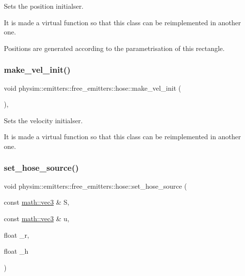 Sets the position initialser. 

It is made a virtual function so that this class can be reimplemented in another one.

Positions are generated according to the parametrisation of this rectangle. \mbox{\label{classphysim_1_1emitters_1_1free__emitters_1_1hose_a7976365f9101e4095d00dc8eafc82ebb}} 
\subsubsection{\texorpdfstring{make\+\_\+vel\+\_\+init()}{make\_vel\_init()}}
{\footnotesize\ttfamily void physim\+::emitters\+::free\+\_\+emitters\+::hose\+::make\+\_\+vel\+\_\+init (\begin{DoxyParamCaption}{ }\end{DoxyParamCaption})\hspace{0.3cm}{\ttfamily [protected]}, {\ttfamily [virtual]}}



Sets the velocity initialser. 

It is made a virtual function so that this class can be reimplemented in another one. \mbox{\label{classphysim_1_1emitters_1_1free__emitters_1_1hose_aeffa7bc72509d3ae1262244815f97737}} 
\subsubsection{\texorpdfstring{set\+\_\+hose\+\_\+source()}{set\_hose\_source()}}
{\footnotesize\ttfamily void physim\+::emitters\+::free\+\_\+emitters\+::hose\+::set\+\_\+hose\+\_\+source (\begin{DoxyParamCaption}\item[{const \hyperlink{structphysim_1_1math_1_1vec3}{math\+::vec3} \&}]{S,  }\item[{const \hyperlink{structphysim_1_1math_1_1vec3}{math\+::vec3} \&}]{u,  }\item[{float}]{\+\_\+r,  }\item[{float}]{\+\_\+h }\end{DoxyParamCaption})}



